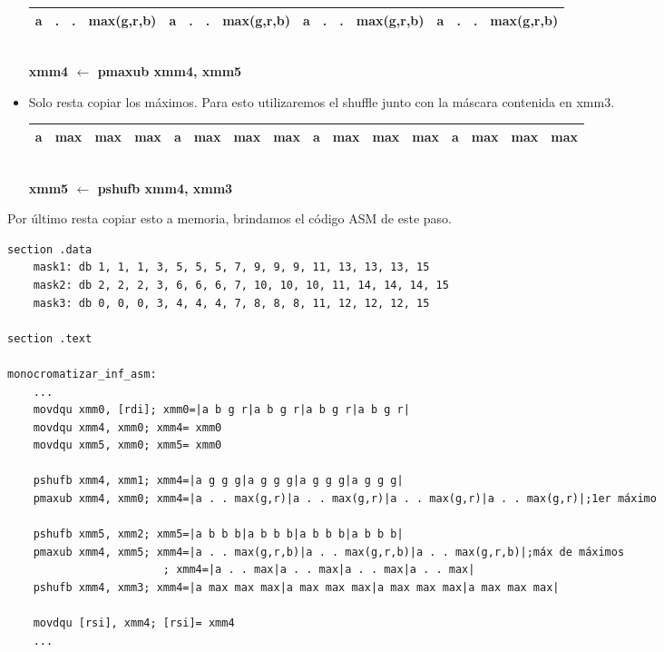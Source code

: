 \begin{itemize}
		\begin{center}
		   \begin{tabular}{| c | c | c | c || c | c | c | c || c | c | c | c || c | c | c | c |}
			 \hline
			 a & . & . & max(g,r,b) & a & . & . & max(g,r,b) & a & . & . & max(g,r,b) & a & . & . & max(g,r,b)  \\ \hline
		   \end{tabular}
		   \\ \textbf{xmm4 $\gets$ pmaxub xmm4, xmm5}
		\end{center}


	\item Solo resta copiar los máximos. Para esto utilizaremos el shuffle junto con la máscara contenida en xmm3.

		\begin{center}
		   \begin{tabular}{| c | c | c | c || c | c | c | c || c | c | c | c || c | c | c | c |}
			 \hline
			 a & max & max & max & a & max & max & max & a & max & max & max & a & max & max & max  \\ \hline
		   \end{tabular}
		   \\ \textbf{xmm5 $\gets$ pshufb xmm4, xmm3}
		\end{center}

\end{itemize}

Por último resta copiar esto a memoria, brindamos el código ASM de este paso.

\begin{codesnippet}
\begin{verbatim}
section .data
	mask1: db 1, 1, 1, 3, 5, 5, 5, 7, 9, 9, 9, 11, 13, 13, 13, 15
	mask2: db 2, 2, 2, 3, 6, 6, 6, 7, 10, 10, 10, 11, 14, 14, 14, 15
	mask3: db 0, 0, 0, 3, 4, 4, 4, 7, 8, 8, 8, 11, 12, 12, 12, 15

section .text

monocromatizar_inf_asm:
	...
	movdqu xmm0, [rdi]; xmm0=|a b g r|a b g r|a b g r|a b g r|
	movdqu xmm4, xmm0; xmm4= xmm0
	movdqu xmm5, xmm0; xmm5= xmm0

	pshufb xmm4, xmm1; xmm4=|a g g g|a g g g|a g g g|a g g g|
	pmaxub xmm4, xmm0; xmm4=|a . . max(g,r)|a . . max(g,r)|a . . max(g,r)|a . . max(g,r)|;1er máximo

	pshufb xmm5, xmm2; xmm5=|a b b b|a b b b|a b b b|a b b b|			
	pmaxub xmm4, xmm5; xmm4=|a . . max(g,r,b)|a . . max(g,r,b)|a . . max(g,r,b)|;máx de máximos
						; xmm4=|a . . max|a . . max|a . . max|a . . max|	
	pshufb xmm4, xmm3; xmm4=|a max max max|a max max max|a max max max|a max max max|

	movdqu [rsi], xmm4; [rsi]= xmm4
	...
\end{verbatim}
\end{codesnippet}